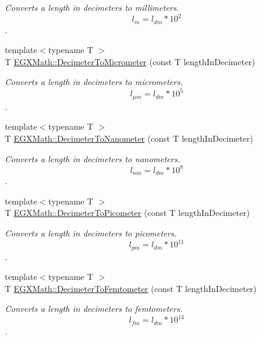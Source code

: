 \begin{DoxyCompactItemize}
\begin{DoxyCompactList}\small\item\em Converts a length in decimeters to millimeters. \[ l_{m}=l_{dm} * 10^{2} \]. \end{DoxyCompactList}\item 
{\footnotesize template$<$typename T $>$ }\\T \mbox{\hyperlink{group___e_g_x_math-_conversions-_length_conversions-_decimeter-_s_i_ga5cf28083fa005b5a6a0dd6817c1633b7}{E\+G\+X\+Math\+::\+Decimeter\+To\+Micrometer}} (const T length\+In\+Decimeter)
\begin{DoxyCompactList}\small\item\em Converts a length in decimeters to micrometers. \[ l_{\mu m}=l_{dm} * 10^{5} \]. \end{DoxyCompactList}\item 
{\footnotesize template$<$typename T $>$ }\\T \mbox{\hyperlink{group___e_g_x_math-_conversions-_length_conversions-_decimeter-_s_i_ga5bf2905937fea582ee35031d9017807f}{E\+G\+X\+Math\+::\+Decimeter\+To\+Nanometer}} (const T length\+In\+Decimeter)
\begin{DoxyCompactList}\small\item\em Converts a length in decimeters to nanometers. \[ l_{nm}=l_{dm} * 10^{8} \]. \end{DoxyCompactList}\item 
{\footnotesize template$<$typename T $>$ }\\T \mbox{\hyperlink{group___e_g_x_math-_conversions-_length_conversions-_decimeter-_s_i_gaac5fa4b7b538abe2d19f33e131e9bbde}{E\+G\+X\+Math\+::\+Decimeter\+To\+Picometer}} (const T length\+In\+Decimeter)
\begin{DoxyCompactList}\small\item\em Converts a length in decimeters to picometers. \[ l_{pm}=l_{dm} * 10^{11} \]. \end{DoxyCompactList}\item 
{\footnotesize template$<$typename T $>$ }\\T \mbox{\hyperlink{group___e_g_x_math-_conversions-_length_conversions-_decimeter-_s_i_gab06170fbc8b349582e4ae34d41f3f706}{E\+G\+X\+Math\+::\+Decimeter\+To\+Femtometer}} (const T length\+In\+Decimeter)
\begin{DoxyCompactList}\small\item\em Converts a length in decimeters to femtometers. \[ l_{fm}=l_{dm} * 10^{14} \]. \end{DoxyCompactList}\item 

\end{DoxyCompactItemize}
